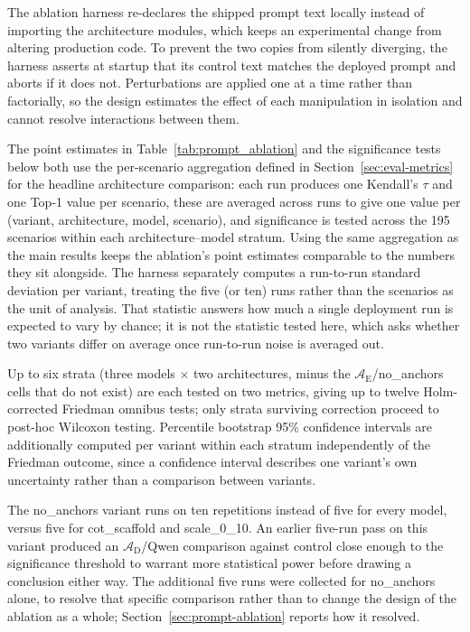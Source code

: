 \documentclass[a4paper,fleqn]{cas-dc}
\begin{document}
The ablation harness re-declares the shipped prompt text locally instead of importing the architecture modules, which keeps an experimental change from altering production code. To prevent the two copies from silently diverging, the harness asserts at startup that its control text matches the deployed prompt and aborts if it does not. Perturbations are applied one at a time rather than factorially, so the design estimates the effect of each manipulation in isolation and cannot resolve interactions between them.

The point estimates in Table~\ref{tab:prompt_ablation} and the significance tests below both use the per-scenario aggregation defined in Section~\ref{sec:eval-metrics} for the headline architecture comparison: each run produces one Kendall's $\tau$ and one Top-1 value per scenario, these are averaged across runs to give one value per (variant, architecture, model, scenario), and significance is tested across the 195 scenarios within each architecture--model stratum. Using the same aggregation as the main results keeps the ablation's point estimates comparable to the numbers they sit alongside. The harness separately computes a run-to-run standard deviation per variant, treating the five (or ten) runs rather than the scenarios as the unit of analysis. That statistic answers how much a single deployment run is expected to vary by chance; it is not the statistic tested here, which asks whether two variants differ on average once run-to-run noise is averaged out.

Up to six strata (three models $\times$ two architectures, minus the $\mathcal{A}_{\text{E}}$/no\_anchors cells that do not exist) are each tested on two metrics, giving up to twelve Holm-corrected Friedman omnibus tests; only strata surviving correction proceed to post-hoc Wilcoxon testing. Percentile bootstrap 95\% confidence intervals are additionally computed per variant within each stratum independently of the Friedman outcome, since a confidence interval describes one variant's own uncertainty rather than a comparison between variants.

The no\_anchors variant runs on ten repetitions instead of five for every model, versus five for cot\_scaffold and scale\_0\_10. An earlier five-run pass on this variant produced an $\mathcal{A}_{\text{D}}$/Qwen comparison against control close enough to the significance threshold to warrant more statistical power before drawing a conclusion either way. The additional five runs were collected for no\_anchors alone, to resolve that specific comparison rather than to change the design of the ablation as a whole; Section~\ref{sec:prompt-ablation} reports how it resolved.
\end{document}

